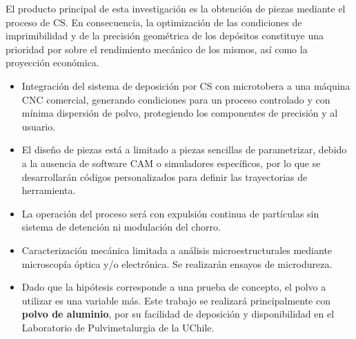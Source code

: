 El producto principal de esta investigación es la obtención de piezas mediante el proceso de CS. En consecuencia, la optimización de las condiciones de imprimibilidad y de la precisión geométrica de los depósitos constituye una prioridad por sobre el rendimiento mecánico de los mismos, así como la proyección económica.

\begin{itemize}
	\item Integración del sistema de deposición por CS con microtobera a una máquina CNC comercial, generando condiciones para un proceso controlado y con mínima dispersión de polvo, protegiendo los componentes de precisión y al usuario.
	\item El diseño de piezas está a limitado a piezas sencillas de parametrizar, debido a la ausencia de software CAM o simuladores específicos, por lo que se desarrollarán códigos personalizados para definir las trayectorias de herramienta.
	\item La operación del proceso será con expulsión continua de partículas sin sistema de detención ni modulación del chorro.
	\item Caracterización mecánica limitada a análisis microestructurales mediante microscopía óptica y/o electrónica. Se realizarán ensayos de microdureza.
	\item Dado que la hipótesis corresponde a una prueba de concepto, el polvo a utilizar es una variable más. Este trabajo se realizará principalmente con \textbf{polvo de aluminio}, por su facilidad de deposición y disponibilidad en el Laboratorio de Pulvimetalurgia de la UChile.
\end{itemize}


